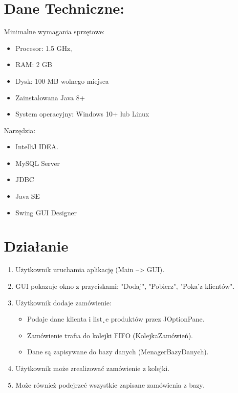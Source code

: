 \section{Dane Techniczne:}
\label{sec:Narzędzia:}
Minimalne wymagania sprzętowe:
\begin{itemize}
	\item Procesor: 1.5 GHz,
	\item RAM: 2 GB
	\item Dysk: 100 MB wolnego miejsca
	\item Zainstalowana Java 8+
	\item System operacyjny: Windows 10+ lub Linux
\end{itemize}
Narzędzia:
\begin{itemize}
      \item IntelliJ IDEA.
      \item MySQL Server
      \item JDBC
      \item Java SE
      \item Swing GUI Designer
\end{itemize}



\section{Działanie}


      \begin{enumerate}
            \item Użytkownik uruchamia aplikację (Main –> GUI).
            \item GUI pokazuje okno z przyciskami: "Dodaj", "Pobierz", "Poka˙z klientów".
            \item Użytkownik dodaje zamówienie:
            \begin{itemize}
            	\item Podaje dane klienta i list˛e produktów przez JOptionPane.
            	\item Zamówienie trafia do kolejki FIFO (KolejkaZamówień).
            	\item Dane są zapisywane do bazy danych (MenagerBazyDanych).
            \end{itemize} 
            \item Użytkownik może zrealizować zamówienie z kolejki.
            \item Może również podejrzeć wszystkie zapisane zamówienia z bazy.
		\end{enumerate}


